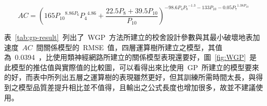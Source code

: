 
\begin{equation} AC = {({165 P_{10}}^{8.86 P_6} {P_4}^{4.86} + \dfrac{22.5 P_8 + 39.5 P_{10}}{P_{10}} )}^{-98.6 P_4{P_8}^{-1.3} - 133 P_{10} - 0.05 {P_7}^{1.38 P_{10}} }  \label{eq:WGP_AC}\end{equation}


表~\ref{tab:gp-result}~列出了~WGP~方法所建立的校舍設計參數與其最小破壞地表加速度~$AC$~間關係模型的~RMSE~值，四層運算樹所建立之模型，其值為~0.0394~，比使用類神經網路所建立的關係模型表現還要好，圖~\ref{fig:WGP}~是此模型的推估值與實際值的比較圖，可以看得出來比使用~GP~所建立的模型要來的好，而表中所列出五層之運算樹的表現雖然更好，但其訓練所需時間太長，與得到之模型品質差提升相比並不值得，且輸出之公式長度也增加很多，故並不建議使用。




